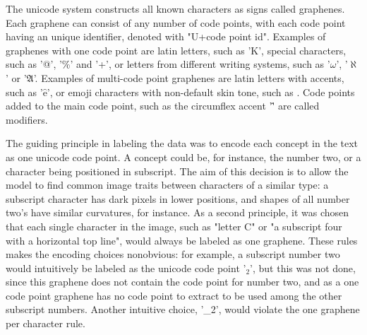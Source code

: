 \documentclass{article}
\begin{document}
The unicode system \cite{unicode_homepage} constructs all known characters as signs called graphenes.
Each graphene can consist of any number of code points, with each code point having an unique identifier, denoted with "U+code point id".
Examples of graphenes with one code point are latin letters, such as 'K', special characters, such as '@', '\%' and '+',
or letters from different writing systems, such as '$\omega$', '$\aleph$' or '$\mathfrak{A}$'.
 Examples of multi-code point graphenes 
are latin letters with accents, such as '$\hat{\text{e}}$', or emoji characters with non-default skin tone, such as {}.
Code points added to the main code point, such as the circumflex accent '\^ ' are called modifiers.

The guiding principle in labeling the data was to encode each concept in the text as one unicode code point. A concept could be, for 
instance, the number two, or a character being positioned in subscript. The aim of this decision is to allow the model 
to find common image traits between characters of a similar type: a subscript character has dark pixels in lower positions, and shapes of all 
number two's have similar curvatures, for instance. As a second principle, it was chosen that each single character in the image, such as "letter C" 
or "a subscript four with a horizontal top line", would always be labeled as one graphene. 
These rules makes the encoding choices nonobvious: for example, 
a subscript number two would intuitively be labeled as the unicode code point '$_2$', but this was not done, 
since this graphene does not contain the code point for number two, 
and as a one code point graphene has no code point to extract to be used among the other subscript numbers.
Another intuitive choice, '\_2', would violate the one graphene per character rule.
\end{document}
